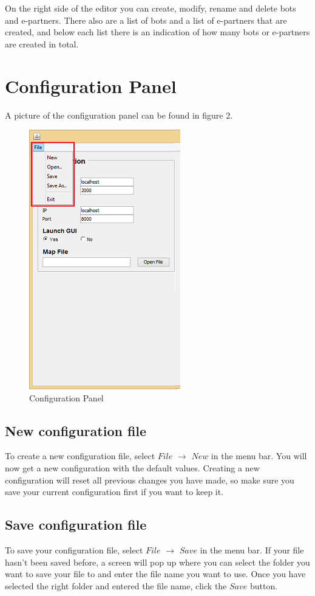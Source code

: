 \documentclass[a4paper]{article}
\begin{document}
On the right side of the editor you can create, modify, rename and delete bots and e-partners. There also are a list of bots and a list of e-partners that are created, and below each list there is an indication of how many bots or e-partners are created in total.
\pagebreak
\section{Configuration Panel}
A picture of the configuration panel can be found in figure 2.
\begin{figure}[h]
\begin{center}
\includegraphics{config.png}
\end{center}
\caption{Configuration Panel}
\end{figure}
\subsection{New configuration file}
To create a new configuration file, select $File$ $\to$ $New$ in the menu bar. You will now get a new configuration with the default values. Creating a new configuration will reset all previous changes you have made, so make sure you save your current configuration first if you want to keep it.

\subsection{Save configuration file}
To save your configuration file, select $File$ $\to$ $Save$ in the menu bar. If your file hasn't been saved before, a screen will pop up where you can select the folder you want to save your file to and enter the file name you want to use. Once you have selected the right folder and entered the file name, click the $Save$ button.
\end{document}

